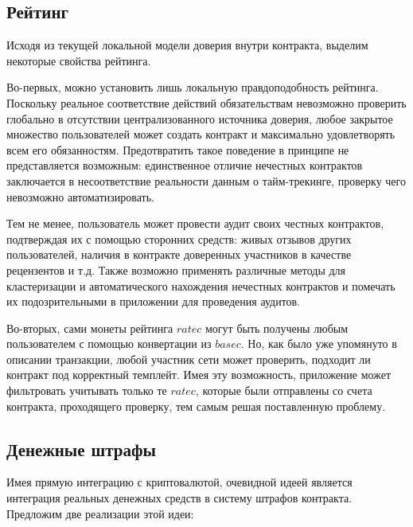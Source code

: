 \documentclass[specification,annotation]{itmo-student-thesis}
\begin{document}
\subsection{Рейтинг}

Исходя из текущей локальной модели доверия внутри контракта, выделим
некоторые свойства рейтинга.

Во-первых, можно установить лишь локальную правдоподобность
рейтинга. Поскольку реальное соответствие действий обязательствам
невозможно проверить глобально в отсутствии централизованного
источника доверия, любое закрытое множество пользователей может
создать контракт и максимально удовлетворять всем его
обязанностям. Предотвратить такое поведение в принципе не
представляется возможным: единственное отличие нечестных контрактов
заключается в несоответствие реальности данным о тайм-трекинге,
проверку чего невозможно автоматизировать.

Тем не менее, пользователь может провести аудит своих честных
контрактов, подтверждая их с помощью сторонних средств: живых отзывов
других пользователей, наличия в контракте доверенных участников в
качестве рецензентов и т.д. Также возможно применять различные методы
для кластеризации и автоматического нахождения нечестных контрактов и
помечать их подозрительными в приложении для проведения аудитов.

Во-вторых, сами монеты рейтинга $ratec$ могут быть получены любым
пользователем с помощью конвертации из $basec$. Но, как было уже
упомянуто в описании транзакции, любой участник сети может проверить,
подходит ли контракт под корректный темплейт. Имея эту возможность,
приложение может фильтровать учитывать только те $ratec$, которые были
отправлены со счета контракта, проходящего проверку, тем самым решая
поставленную проблему.

\subsection{Денежные штрафы}

Имея прямую интеграцию с криптовалютой, очевидной идеей является
интеграция реальных денежных средств в систему штрафов
контракта. Предложим две реализации этой идеи:
\end{document}

